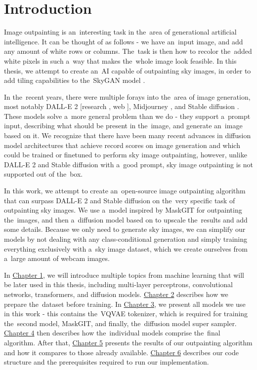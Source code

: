 \chapter*{Introduction}


Image outpainting is an~interesting task in the~area of generational artificial intelligence. It can be thought of as follows - we have an~input image, and add any amount of white rows or columns. The~task is then how to recolor the~added white pixels in such a~way that makes the~whole image look feasible. In this thesis, we attempt to create an~AI capable of outpainting sky images, in order to add tiling capabilities to the~SkyGAN model \citep{skygan}.

In the~recent years, there were multiple forays into the~area of image generation, most notably DALL-E 2 [research \citep{dalle_2}, web \citep{dalle_2_web}], Midjourney \citep{midjourney_web}, and Stable diffusion \citep{stable_diffusion_web}. These models solve a~more general problem than we do - they support a~prompt input, describing what should be present in the~image, and generate an~image based on it. We recognize that there have been many recent advances in diffusion model architectures that achieve record scores on image generation and which could be trained or finetuned to perform sky image outpainting, however, unlike DALL-E 2 and Stable diffusion with a~good prompt, sky image outpainting is not supported out of the~box.

In this work, we attempt to create an~open-source image outpainting algorithm that can surpass DALL-E 2 and Stable diffusion on the~very specific task of outpainting sky images. We use a~model inspired by MaskGIT \citep{maskgit} for outpainting the~images, and then a~diffusion model based on \citep{diffusion_super_sampler} to upscale the~results and add some details. Because we only need to generate sky images, we can simplify our models by not dealing with any class-conditional generation and simply training everything exclusively with a~sky image dataset, which we create ourselves from a~large amount of webcam images.

In \hyperref[background]{Chapter 1}, we will introduce multiple topics from machine learning that will be later used in this thesis, including multi-layer perceptrons, convolutional networks, transformers, and diffusion models. \hyperref[dataset]{Chapter 2} describes how we prepare the~dataset before training. In \hyperref[models]{Chapter 3}, we present all models we use in this work - this contains the~VQVAE tokenizer, which is required for training the~second model, MaskGIT, and finally, the~diffusion model super sampler. \hyperref[outpainting]{Chapter 4} then describes how the~individual models comprise the~final algorithm. After that, \hyperref[results]{Chapter 5} presents the results of our outpainting algorithm and how it compares to those already available. \hyperref[code]{Chapter 6} describes our code structure and the prerequisites required to run our implementation.


